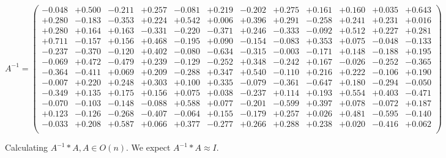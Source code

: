 \documentclass[9pt]{article}
\theoremstyle{plain}
\theoremstyle{definition}
\theoremstyle{remark}
\numberwithin{equation}{section}
\begin{document}
$A^{-1} = \left(
\begin{array}{
cccccccccccc}
-0.048 & +0.500 & -0.211 & +0.257 & -0.081 & +0.219 & -0.202 & +0.275 & +0.161 & +0.160 & +0.035 & +0.643 \\
+0.280 & -0.183 & -0.353 & +0.224 & +0.542 & +0.006 & +0.396 & +0.291 & -0.258 & +0.241 & +0.231 & +0.016 \\
+0.280 & +0.164 & +0.163 & -0.331 & -0.220 & -0.371 & +0.246 & -0.333 & -0.092 & +0.512 & +0.227 & +0.281 \\
+0.711 & -0.157 & +0.156 & +0.468 & -0.195 & +0.090 & -0.154 & -0.083 & +0.353 & +0.075 & -0.048 & -0.133 \\
-0.237 & -0.370 & -0.120 & +0.402 & -0.080 & -0.634 & -0.315 & -0.003 & -0.171 & +0.148 & -0.188 & +0.195 \\
-0.069 & +0.472 & -0.479 & +0.239 & -0.129 & -0.252 & +0.348 & -0.242 & +0.167 & -0.026 & -0.252 & -0.365 \\
-0.364 & -0.411 & +0.069 & +0.209 & -0.288 & +0.347 & +0.540 & -0.110 & +0.216 & +0.222 & -0.106 & +0.190 \\
-0.007 & +0.220 & +0.248 & +0.303 & +0.100 & +0.335 & -0.079 & -0.361 & -0.647 & +0.180 & -0.294 & -0.050 \\
-0.349 & +0.135 & +0.175 & +0.156 & +0.075 & +0.038 & -0.237 & +0.114 & +0.193 & +0.554 & +0.403 & -0.471 \\
-0.070 & -0.103 & -0.148 & -0.088 & +0.588 & +0.077 & -0.201 & -0.599 & +0.397 & +0.078 & -0.072 & +0.187 \\
+0.123 & -0.126 & -0.268 & -0.407 & -0.064 & +0.155 & -0.179 & +0.257 & +0.026 & +0.481 & -0.595 & -0.140 \\
-0.033 & +0.208 & +0.587 & +0.066 & +0.377 & -0.277 & +0.266 & +0.288 & +0.238 & +0.020 & -0.416 & +0.062 \\
\end{array}
\right)$ \newline 

Calculating $A^{-1} *A  ,  A \in O(n)$.   We expect $A^{-1} *A  \approx I$. 
\end{document}
